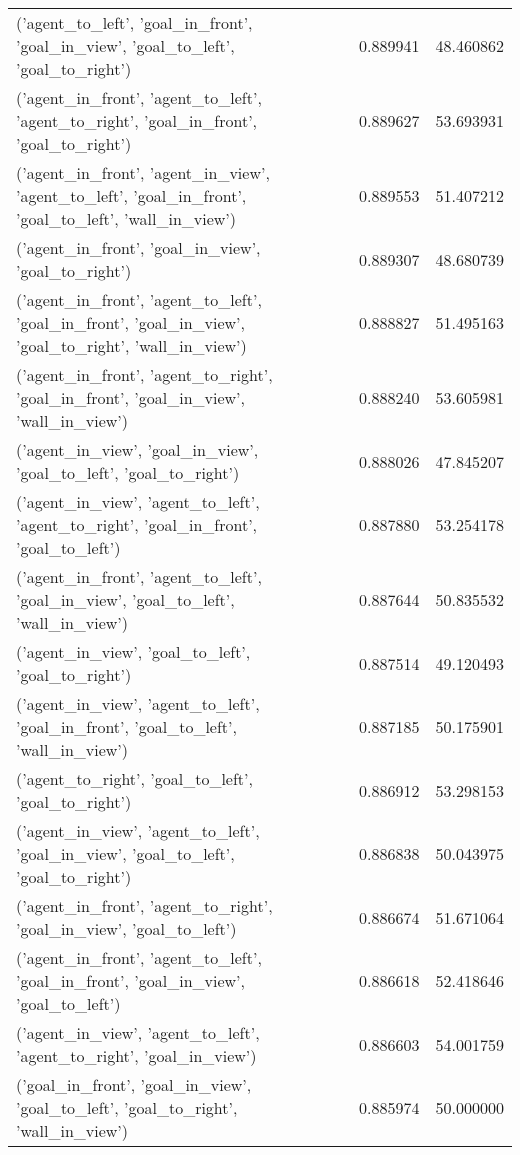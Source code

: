 \begin{tabular}{lrr}
('agent\_to\_left', 'goal\_in\_front', 'goal\_in\_view', 'goal\_to\_left', 'goal\_to\_right') & 0.889941 & 48.460862 \\
('agent\_in\_front', 'agent\_to\_left', 'agent\_to\_right', 'goal\_in\_front', 'goal\_to\_right') & 0.889627 & 53.693931 \\
('agent\_in\_front', 'agent\_in\_view', 'agent\_to\_left', 'goal\_in\_front', 'goal\_to\_left', 'wall\_in\_view') & 0.889553 & 51.407212 \\
('agent\_in\_front', 'goal\_in\_view', 'goal\_to\_right') & 0.889307 & 48.680739 \\
('agent\_in\_front', 'agent\_to\_left', 'goal\_in\_front', 'goal\_in\_view', 'goal\_to\_right', 'wall\_in\_view') & 0.888827 & 51.495163 \\
('agent\_in\_front', 'agent\_to\_right', 'goal\_in\_front', 'goal\_in\_view', 'wall\_in\_view') & 0.888240 & 53.605981 \\
('agent\_in\_view', 'goal\_in\_view', 'goal\_to\_left', 'goal\_to\_right') & 0.888026 & 47.845207 \\
('agent\_in\_view', 'agent\_to\_left', 'agent\_to\_right', 'goal\_in\_front', 'goal\_to\_left') & 0.887880 & 53.254178 \\
('agent\_in\_front', 'agent\_to\_left', 'goal\_in\_view', 'goal\_to\_left', 'wall\_in\_view') & 0.887644 & 50.835532 \\
('agent\_in\_view', 'goal\_to\_left', 'goal\_to\_right') & 0.887514 & 49.120493 \\
('agent\_in\_view', 'agent\_to\_left', 'goal\_in\_front', 'goal\_to\_left', 'wall\_in\_view') & 0.887185 & 50.175901 \\
('agent\_to\_right', 'goal\_to\_left', 'goal\_to\_right') & 0.886912 & 53.298153 \\
('agent\_in\_view', 'agent\_to\_left', 'goal\_in\_view', 'goal\_to\_left', 'goal\_to\_right') & 0.886838 & 50.043975 \\
('agent\_in\_front', 'agent\_to\_right', 'goal\_in\_view', 'goal\_to\_left') & 0.886674 & 51.671064 \\
('agent\_in\_front', 'agent\_to\_left', 'goal\_in\_front', 'goal\_in\_view', 'goal\_to\_left') & 0.886618 & 52.418646 \\
('agent\_in\_view', 'agent\_to\_left', 'agent\_to\_right', 'goal\_in\_view') & 0.886603 & 54.001759 \\
('goal\_in\_front', 'goal\_in\_view', 'goal\_to\_left', 'goal\_to\_right', 'wall\_in\_view') & 0.885974 & 50.000000 \\

\end{tabular}

